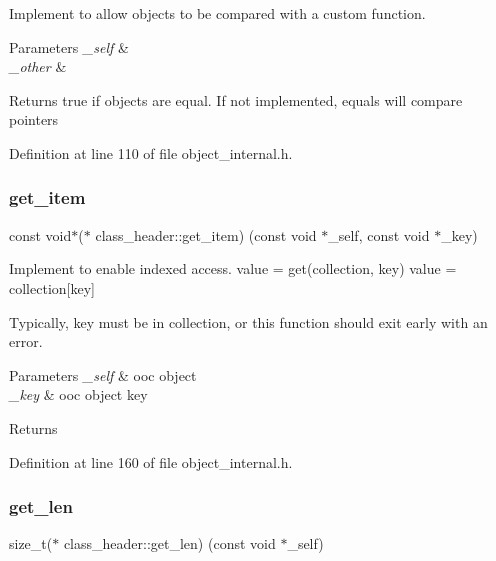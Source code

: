 Implement to allow objects to be compared with a custom function. 
\begin{DoxyParams}{Parameters}
{\em \+\_\+self} & \\
\hline
{\em \+\_\+other} & \\
\hline
\end{DoxyParams}
\begin{DoxyReturn}{Returns}
true if objects are equal. If not implemented, equals will compare pointers 
\end{DoxyReturn}


Definition at line 110 of file object\+\_\+internal.\+h.

\mbox{\label{structclass__header_ae59ea98ace6dc13ad2182a1433f78110}} 
\subsubsection{\texorpdfstring{get\+\_\+item}{get\_item}}
{\footnotesize\ttfamily const void$\ast$($\ast$ class\+\_\+header\+::get\+\_\+item) (const void $\ast$\+\_\+self, const void $\ast$\+\_\+key)}

Implement to enable indexed access. value = get(collection, key) value = collection\mbox{[}key\mbox{]}

Typically, key must be in collection, or this function should exit early with an error. 
\begin{DoxyParams}{Parameters}
{\em \+\_\+self} & ooc object \\
\hline
{\em \+\_\+key} & ooc object key \\
\hline
\end{DoxyParams}
\begin{DoxyReturn}{Returns}

\end{DoxyReturn}


Definition at line 160 of file object\+\_\+internal.\+h.

\mbox{\label{structclass__header_a1b7cb949741b9a64fd3569af94f30cba}} 
\subsubsection{\texorpdfstring{get\+\_\+len}{get\_len}}
{\footnotesize\ttfamily size\+\_\+t($\ast$ class\+\_\+header\+::get\+\_\+len) (const void $\ast$\+\_\+self)}



